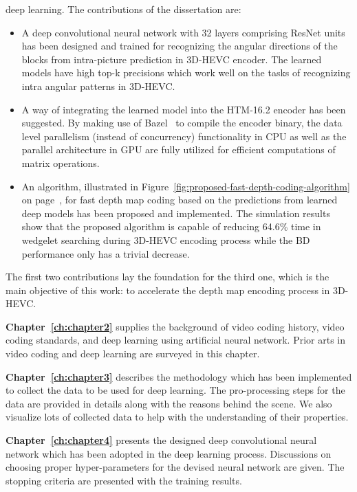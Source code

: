 deep learning.
The contributions of the dissertation are:
\begin{itemize}
  \item A deep convolutional neural network with 32 layers comprising ResNet
  units~\parencite{RN67} has been designed and trained for recognizing the
  angular directions of the blocks from intra-picture prediction in 3D-HEVC
  encoder.
  The learned models have high top-k precisions which work well on the
  tasks of recognizing intra angular patterns in 3D-HEVC.
  \item A way of integrating the learned model into the HTM-16.2 encoder has
  been suggested.
  By making use of Bazel~\parencite{RN200} to compile the encoder binary, the
  data level parallelism (instead of concurrency) functionality in CPU
  as well as the parallel architecture in GPU are fully utilized for
  efficient computations of matrix operations.
  \item An algorithm, illustrated in
  Figure~\ref{fig:proposed-fast-depth-coding-algorithm}
  on page~\pageref{fig:proposed-fast-depth-coding-algorithm}, for fast
  depth map coding based
  on the predictions from
  learned deep models has been proposed and implemented.
  The simulation results show that the proposed algorithm is capable of
  reducing 64.6\% time in wedgelet searching during 3D-HEVC encoding process
  while the BD performance only has a trivial decrease.
\end{itemize}
The first two contributions lay the foundation for the third one, which is the
main objective of this work: to accelerate the depth map encoding process in
3D-HEVC.

\textbf{Chapter~\ref{ch:chapter2}} supplies the background of video
coding history, video coding standards, and deep learning using artificial
neural network.
Prior arts in video coding and deep learning are surveyed in this chapter.

\textbf{Chapter~\ref{ch:chapter3}} describes the methodology which has been
implemented to collect the data to be used for deep learning.
The pro-processing steps for the data are provided in details along with
the reasons behind the scene.
We also visualize lots of collected data to help with the understanding of
their properties.

\textbf{Chapter~\ref{ch:chapter4}} presents the designed deep convolutional
neural network which has been adopted in the deep learning process.
Discussions on choosing proper hyper-parameters for the devised neural network
are given.
The stopping criteria are presented with the training results.

